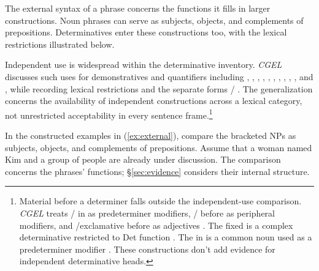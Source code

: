 \documentclass[12pt]{article}
\begin{document}
The external syntax of a phrase concerns the functions it fills in larger constructions. Noun phrases can serve as subjects, objects, and complements of prepositions. Determinatives enter these constructions too, with the lexical restrictions illustrated below.

Independent use is widespread within the determinative inventory. \textit{CGEL} discusses such uses for demonstratives and quantifiers including , , , , , , , , , , and , while recording lexical restrictions and the separate forms / \citep[371--372, 410--424]{huddleston2002}. The generalization concerns the availability of independent constructions across a lexical category, not unrestricted acceptability in every sentence frame.\footnote{Material before a determiner falls outside the independent-use comparison. \textit{CGEL} treats / in  as predeterminer modifiers, / before  as peripheral modifiers, and /exclamative  before  as adjectives \citep[433--437]{huddleston2002}. The fixed  is a complex determinative restricted to Det function \citep[394]{huddleston2002}. The  in  is a common noun used as a predeterminer modifier \citep[434]{huddleston2002}. These constructions don't add evidence for independent determinative heads.}

In the constructed examples in (\ref{ex:external}), compare the bracketed NPs as subjects, objects, and complements of prepositions. Assume that a woman named Kim and a group of people are already under discussion. The comparison concerns the phrases' functions; §\ref{sec:evidence} considers their internal structure.

\begin{samepage}

\ea\label{ex:external}
\ea {}\qquad {}\qquad {}
\ex {}\qquad {}\qquad {}
\ex {}\qquad {}\qquad {}
\ex {}\qquad {}\qquad {}
\z\z

\end{samepage}
\end{document}
